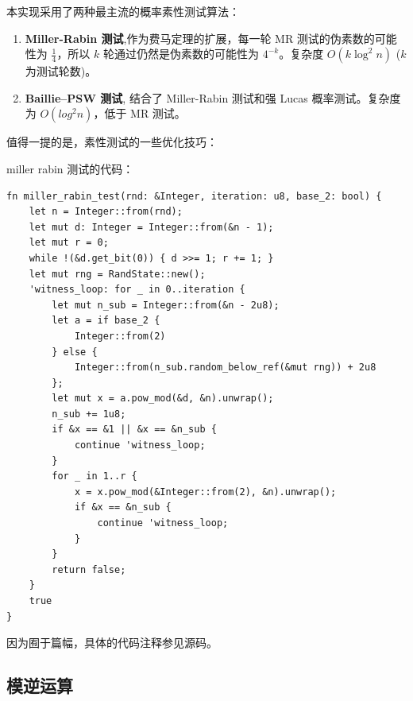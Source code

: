 \documentclass[degree=project,degree-type=project,cjk-font=windows]{thuthesis}
\newcommand*\justify{%
  \fontdimen2\font=0.4em%
  \fontdimen3\font=0.2em%
  \fontdimen4\font=0.1em%
  \fontdimen7\font=0.1em%
  \hyphenchar\font=`\-%
}
\renewcommand{\texttt}[1]{%
  \begingroup
  \ttfamily
  \begingroup\lccode`~=`/\lowercase{\endgroup\def~}{/\discretionary{}{}{}}%
  \begingroup\lccode`~=`[\lowercase{\endgroup\def~}{[\discretionary{}{}{}}%
  \begingroup\lccode`~=`.\lowercase{\endgroup\def~}{.\discretionary{}{}{}}%
  \catcode`/=\active\catcode`[=\active\catcode`.=\active
  \justify\scantokens{#1\noexpand}%
  \endgroup
}
\begin{document}
本实现采用了两种最主流的概率素性测试算法：

\begin{enumerate}
  \item \textbf{Miller-Rabin 测试},作为费马定理的扩展，每一轮 MR 测试的伪素数的可能性为 $\frac{1}{4}$，所以 $k$ 轮通过仍然是伪素数的可能性为 $4^{-k}$。复杂度 $O(k \log^2 n)$ ($k$ 为测试轮数)。
  \item \textbf{Baillie–PSW 测试}, 结合了 Miller-Rabin 测试和强 Lucas 概率测试。复杂度为 $O(log^2 n)$，低于 MR 测试。
\end{enumerate}

值得一提的是，素性测试的一些优化技巧：


miller rabin 测试的代码：

\begin{verbatim}
fn miller_rabin_test(rnd: &Integer, iteration: u8, base_2: bool) {
    let n = Integer::from(rnd);
    let mut d: Integer = Integer::from(&n - 1);
    let mut r = 0;
    while !(&d.get_bit(0)) { d >>= 1; r += 1; }
    let mut rng = RandState::new();
    'witness_loop: for _ in 0..iteration {
        let mut n_sub = Integer::from(&n - 2u8);
        let a = if base_2 {
            Integer::from(2)
        } else {
            Integer::from(n_sub.random_below_ref(&mut rng)) + 2u8
        };
        let mut x = a.pow_mod(&d, &n).unwrap();
        n_sub += 1u8;
        if &x == &1 || &x == &n_sub {
            continue 'witness_loop;
        }
        for _ in 1..r {
            x = x.pow_mod(&Integer::from(2), &n).unwrap();
            if &x == &n_sub {
                continue 'witness_loop;
            }
        }
        return false;
    }
    true
}
\end{verbatim}

因为囿于篇幅，具体的代码注释参见源码。

\subsection{模逆运算}
\end{document}
